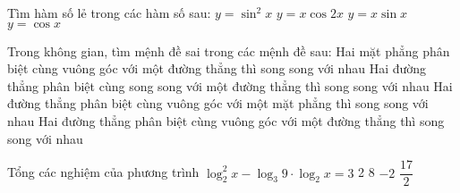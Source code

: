 \begin{ex}%
	Tìm hàm số lẻ trong các hàm số sau:
	\choice
	{$y=\sin^2x$}
	{\True $y=x\cos2x$}
	{ $y=x\sin x$}
	{$y=\cos x$}	
	
\end{ex} 

\begin{ex}%
	Trong không gian, tìm mệnh đề sai trong các mệnh đề sau:
	\choice
	{Hai mặt phẳng phân biệt cùng vuông góc với một đường thẳng thì song song với nhau}
	{ Hai đường thẳng phân biệt cùng song song với một đường thẳng thì song song với nhau}
	{ Hai đường thẳng phân biệt cùng vuông góc với một mặt phẳng thì song song với nhau}
	{\True Hai đường thẳng phân biệt cùng vuông góc với một đường thẳng thì song song với nhau}	
\end{ex} 

\begin{ex}%
Tổng các nghiệm của phương trình $\log_2^2x-\log_3 9\cdot \log_2x=3$
	\choice
	{2}
	{ 8}
	{ $-2$}
	{\True $\dfrac{17}{2}$}	
	
\end{ex}

